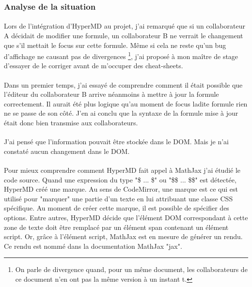 \documentclass[12pt]{article}
\begin{document}
\subsubsection{Analyse de la situation}
\paragraph{}
Lors de l'intégration d'HyperMD au projet, j'ai remarqué que si un collaborateur A décidait de modifier une formule, un collaborateur B ne verrait le changement que s'il mettait le focus sur cette formule. Même si cela ne reste qu'un bug d'affichage ne causant pas de divergences \footnote{On parle de divergence quand, pour un même document, les collaborateurs de ce document n'en ont pas la même version à un instant t.}, j'ai proposé à mon maître de stage d'essayer de le corriger avant de m'occuper des cheat-sheets.
\paragraph{}
Dans un premier temps, j'ai essayé de comprendre comment il était possible que l'éditeur du collaborateur B arrive néanmoins à mettre à jour la formule correctement. Il aurait été plus logique qu'au moment de focus ladite formule rien ne se passe de son côté. J'en ai conclu que la syntaxe de la formule mise à jour était donc bien transmise aux collaborateurs.
\paragraph{}
J'ai pensé que l'information pouvait être stockée dans le DOM. Mais je n'ai constaté aucun changement dans le DOM.
\paragraph{}
Pour mieux comprendre comment HyperMD fait appel à MathJax j'ai étudié le code source. Quand une expression du type "\$ ... \$" ou "\$\$ ... \$\$" est détectée, HyperMD créé une marque. Au sens de CodeMirror, une marque est ce qui est utilisé pour "marquer" une partie d'un texte en lui attribuant une classe CSS spécifique. Au moment de créer cette marque, il est possible de spécifier des options. Entre autres, HyperMD décide que l'élément DOM correspondant à cette zone de texte doit être remplacé par un élément span contenant un élément script.
Or, grâce à l'élément script, MathJax est en mesure de générer un rendu. Ce rendu est nommé dans la documentation MathJax "jax".
\end{document}
